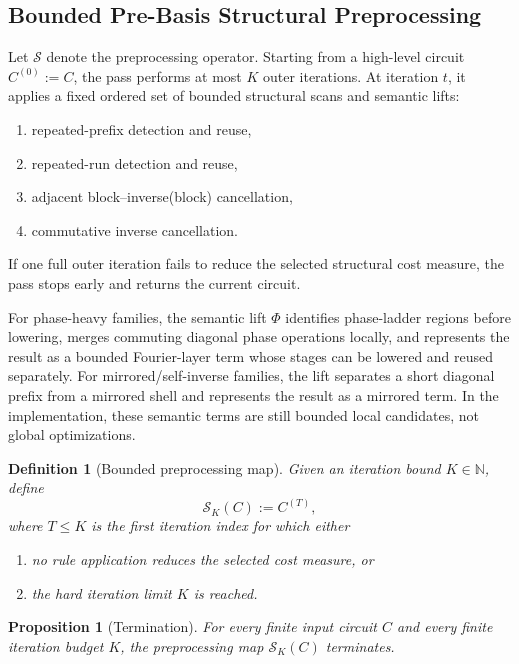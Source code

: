 \documentclass[11pt]{article}
\newtheorem{definition}{Definition}
\newtheorem{proposition}{Proposition}
\begin{document}
\subsection{Bounded Pre-Basis Structural Preprocessing}

Let $\mathcal{S}$ denote the preprocessing operator. Starting from a high-level circuit $C^{(0)} := C$, the pass performs at most $K$ outer iterations. At iteration $t$, it applies a fixed ordered set of bounded structural scans and semantic lifts:
\begin{enumerate}[leftmargin=1.5em]
    \item repeated-prefix detection and reuse,
    \item repeated-run detection and reuse,
    \item adjacent block--inverse(block) cancellation,
    \item commutative inverse cancellation.
\end{enumerate}
If one full outer iteration fails to reduce the selected structural cost measure, the pass stops early and returns the current circuit.

For phase-heavy families, the semantic lift $\Phi$ identifies phase-ladder regions before lowering, merges commuting diagonal phase operations locally, and represents the result as a bounded Fourier-layer term whose stages can be lowered and reused separately. For mirrored/self-inverse families, the lift separates a short diagonal prefix from a mirrored shell and represents the result as a mirrored term. In the implementation, these semantic terms are still bounded local candidates, not global optimizations.

\begin{definition}[Bounded preprocessing map]
Given an iteration bound $K \in \mathbb{N}$, define
\[
\mathcal{S}_K(C) := C^{(T)},
\]
where $T \le K$ is the first iteration index for which either
\begin{enumerate}[leftmargin=1.5em]
    \item no rule application reduces the selected cost measure, or
    \item the hard iteration limit $K$ is reached.
\end{enumerate}
\end{definition}

\begin{proposition}[Termination]
For every finite input circuit $C$ and every finite iteration budget $K$, the preprocessing map $\mathcal{S}_K(C)$ terminates.
\end{proposition}
\end{document}
